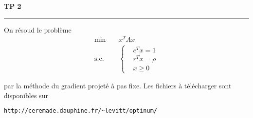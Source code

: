 \documentclass[10pt,a4paper,fleqn]{report}
\begin{document}
\newpage

\begin{center}

\textbf{\huge TP 2}

\smallskip

\rule{10cm}{0.4pt}

\end{center}

On résoud le problème
\begin{align*}
  \text{min} \;\;\;\;&x^{T} A x\\
  \text{s.c.}\;\;\;\;&\begin{cases}
    &e^{T} x = 1\\
  &r^{T} x = \rho\\
  &x \geq 0
  \end{cases}
\end{align*}

par la méthode du gradient projeté à pas fixe. Les fichiers à
télécharger sont disponibles sur

\verb+http://ceremade.dauphine.fr/~levitt/optinum/+
\end{document}
